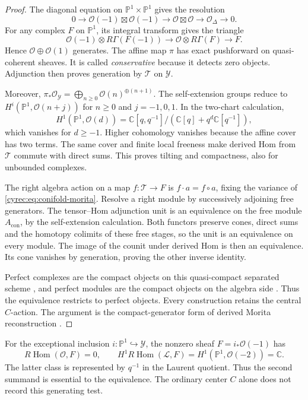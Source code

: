 \begin{proof}
The diagonal equation on $\mathbb P^1\times\mathbb P^1$ gives
the resolution
\[
 0\to\mathcal O(-1)\boxtimes\mathcal O(-1)
   \to\mathcal O\boxtimes\mathcal O\to\mathcal O_\Delta\to0.
\]
For any complex $F$ on $\mathbb P^1$, its integral transform
gives the triangle
\[
 \mathcal O(-1)\otimes R\Gamma(F(-1))
       \longrightarrow\mathcal O\otimes R\Gamma(F)
       \longrightarrow F.
\]
Hence $\mathcal O\oplus\mathcal O(1)$ generates.
The affine map $\pi$ has exact pushforward on quasi-coherent
sheaves. It is called \emph{conservative} because it detects zero objects.
Adjunction then proves generation by
$\mathcal T$ on $\mathcal Y$.

Moreover,
$\pi_*\mathcal O_{\mathcal Y}=
\bigoplus_{n\geq0}\mathcal O(n)^{\oplus(n+1)}$.
The self-extension groups reduce to
$H^i(\mathbb P^1,\mathcal O(n+j))$ for
$n\geq0$ and $j=-1,0,1$.
In the two-chart calculation,
\[
 H^1(\mathbb P^1,\mathcal O(d))
 =\mathbb C[q,q^{-1}]/
           (\mathbb C[q]+q^d\mathbb C[q^{-1}]),
\]
which vanishes for $d\geq-1$.
Higher cohomology vanishes because the affine cover has two terms.
The same cover and finite local freeness make derived Hom from
$\mathcal T$ commute with direct sums. This proves tilting and
compactness, also for unbounded complexes.

The right algebra action on a map $f:\mathcal T\to F$ is
$f\cdot a=f\circ a$, fixing the variance of
\eqref{cyrec:eq:conifold-morita}. Resolve a right module by
successively adjoining free generators. The tensor--Hom adjunction
unit is an equivalence on the free module $A_{\mathrm{con}}$,
by the self-extension calculation. Both functors preserve cones,
direct sums and the homotopy colimits of these free stages, so
the unit is an equivalence on every module.
The image of the counit under derived Hom is then an equivalence.
Its cone vanishes by generation, proving the other inverse identity.

Perfect complexes are the compact objects on this quasi-compact
separated scheme \cite[Tag~09M1]{StacksCompactPerfect}, and
perfect modules are the compact objects on the algebra side
\cite[Corollary~3.7]{KellerDGCategories}. Thus the equivalence
restricts to perfect objects. Every construction retains the
central $C$-action. The argument is the compact-generator form
of derived Morita reconstruction
\cite[Theorem~3.8]{KellerDGCategories}.
\end{proof}

For the exceptional inclusion $i:\mathbb P^1\hookrightarrow\mathcal Y$,
the nonzero sheaf $F=i_*\mathcal O(-1)$ has
\begin{equation}\label{cyrec:eq:exceptional-detector}
 R\operatorname{Hom}(\mathcal O,F)=0,
 \qquad
 H^1R\operatorname{Hom}(\mathcal L,F)
                 =H^1(\mathbb P^1,\mathcal O(-2))=\mathbb C.
\end{equation}
The latter class is represented by $q^{-1}$ in the Laurent
quotient. Thus the second summand is essential to the equivalence.
The ordinary center $C$ alone does not record this generating
test.

